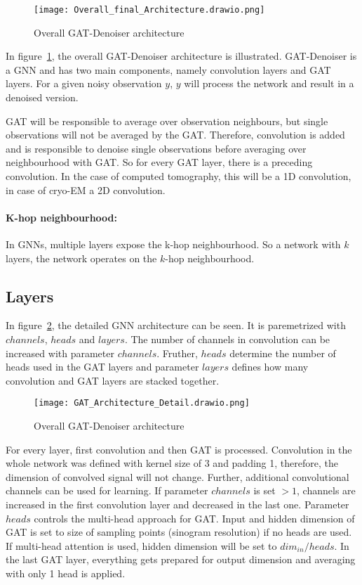 \begin{figure}[H]
  \centering
  \label{fig:architecture-overall}
  \texttt{[image: Overall\_final\_Architecture.drawio.png]}
  \caption{Overall GAT-Denoiser architecture}
\end{figure}

In figure~\ref{fig:architecture-overall}, the overall GAT-Denoiser architecture is illustrated.
GAT-Denoiser is a GNN and has two main components, namely convolution layers and GAT layers.
For a given noisy observation $y$, $y$ will process the network and result in a denoised version.

GAT will be responsible to average over observation neighbours, but single observations will
not be averaged by the GAT. 
Therefore, convolution is added and is responsible to denoise single observations
before averaging over neighbourhood with GAT. So for every GAT layer, there is a preceding convolution. 
In the case of computed tomography, this will be a 1D convolution, in case of cryo-EM a 2D convolution.

\paragraph{K-hop neighbourhood:}
In GNNs, multiple layers expose the k-hop neighbourhood. So a network with $k$ layers,
the network operates on the $k$-hop neighbourhood.


\subsection{Layers}

In figure~\ref{fig:architecture-detailed}, the detailed GNN architecture can be seen.
It is paremetrized with $channels$, $heads$ and $layers$. 
The number of channels in convolution can be increased with parameter $channels$.
Fruther, $heads$ determine the number of heads used in the GAT layers and parameter 
$layers$ defines how many convolution and GAT layers are stacked together.


\begin{figure}[H]
  \centering
  \label{fig:architecture-detailed}
  \texttt{[image: GAT\_Architecture\_Detail.drawio.png]}
  \caption{Overall GAT-Denoiser architecture}
\end{figure}


For every layer, first convolution and then GAT is processed. 
Convolution in the whole network was defined with kernel size of 3 and padding 1,
therefore, the dimension of convolved signal will not change.
Further, additional convolutional channels can be used for learning.
If parameter $channels$ is set $ > 1$, channels are increased in the first convolution layer 
and decreased in the last one.
Parameter $heads$ controls the multi-head approach for GAT. Input and hidden dimension
of GAT is set to size of sampling points (sinogram resolution) if no heads are used.
If multi-head attention is used, hidden dimension will be set to $dim_{in} / heads $.
In the last GAT layer, everything gets prepared for output dimension and 
averaging with only 1 head is applied.




